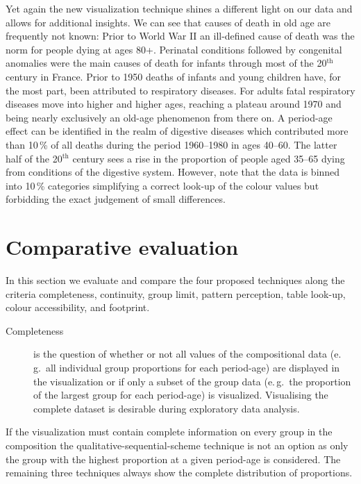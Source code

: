 \documentclass[parskip=half]{scrartcl}
\begin{document}
Yet again the new visualization technique shines a different light on our data and allows for additional insights. We can see that causes of death in old age are frequently not known: Prior to World War II an ill-defined cause of death was the norm for people dying at ages 80+. Perinatal conditions followed by congenital anomalies were the main causes of death for infants through most of the 20$^\text{th}$ century in France. Prior to 1950 deaths of infants and young children have, for the most part, been attributed to respiratory diseases. For adults fatal respiratory diseases move into higher and higher ages, reaching a plateau around 1970 and being nearly exclusively an old-age phenomenon from there on. A period-age effect can be identified in the realm of digestive diseases which contributed more than 10\,\% of all deaths during the period 1960--1980 in ages 40--60. The latter half of the 20$^\text{th}$ century sees a rise in the proportion of people aged 35--65 dying from conditions of the digestive system. However, note that the data is binned into 10\,\% categories simplifying a correct look-up of the colour values but forbidding the exact judgement of small differences.

\clearpage

\section{Comparative evaluation} %
\label{sec:eval}

In this section we evaluate and compare the four proposed techniques along the criteria completeness, continuity, group limit, pattern perception, table look-up, colour accessibility, and footprint.

\begin{description}
  \item[Completeness] is the question of whether or not all values of the compositional data (e.\,g.~all individual group proportions for each period-age) are displayed in the visualization or if only a subset of the group data (e.\,g.~the proportion of the largest group for each period-age) is visualized. Visualising the complete dataset is desirable during exploratory data analysis.
\end{description}

If the visualization must contain complete information on every group in the composition the qualitative-sequential-scheme technique is not an option as only the group with the highest proportion at a given period-age is considered. The remaining three techniques always show the complete distribution of proportions.
\end{document}
